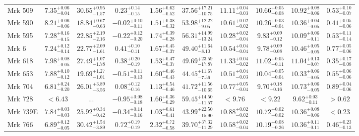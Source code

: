 \documentclass[onecolumn]{mn2e}
\begin{document}
\begin{landscape}
{\begin{center}
\begin{longtable}{lccccccccc}
Mrk 509 & $7.35_{-0.04}^{+0.06}$ & $30.65_{-1.57}^{+0.95}$ & $0.23_{-0.15}^{+0.14}$ & $1.56_{-0.52}^{+0.62}$ &$37.56_{-10.75}^{+17.21}$ & $11.11_{-0.03}^{+0.04}$ & $10.66_{-0.08}^{+0.05}$ & $10.92_{-0.06}^{+0.08}$ & $0.53_{-0.07}^{+0.10}$ \\
Mrk 590 & $8.21_{-0.06}^{+0.06}$ & $18.84_{-0.63}^{+0.67}$ & $-0.02_{-0.11}^{+0.10}$ & $1.51_{-0.32}^{+0.38}$ &$53.98_{-9.05}^{+12.22}$ & $10.61_{-0.02}^{+0.02}$ & $10.26_{-0.04}^{+0.03}$ & $10.36_{-0.05}^{+0.04}$ & $0.41_{-0.06}^{+0.05}$ \\
Mrk 595 & $7.28_{-0.15}^{+0.16}$ & $22.85_{-2.16}^{+2.19}$ & $-0.22_{-0.20}^{+0.12}$ & $1.74_{-0.28}^{+0.39}$ &$56.31_{-13.24}^{+14.99}$ & $10.28_{-0.04}^{+0.02}$ & $9.83_{-0.12}^{+0.09}$ & $10.09_{-0.11}^{+0.06}$ & $0.53_{-0.14}^{+0.11}$ \\
Mrk 6 & $7.24_{-0.14}^{+0.12}$ & $22.77_{-1.61}^{+2.09}$ & $0.41_{-0.11}^{+0.10}$ & $1.67_{-0.37}^{+0.45}$ &$49.40_{-8.10}^{+11.64}$ & $10.54_{-0.04}^{+0.04}$ & $9.78_{-0.08}^{+0.09}$ & $10.46_{-0.05}^{+0.05}$ & $0.77_{-0.06}^{+0.05}$ \\
Mrk 618 & $7.98_{-0.05}^{+0.08}$ & $27.49_{-1.78}^{+1.07}$ & $0.38_{-0.19}^{+0.20}$ & $1.53_{-0.37}^{+0.47}$ &$49.69_{-17.87}^{+23.59}$ & $11.33_{-0.02}^{+0.04}$ & $11.02_{-0.11}^{+0.05}$ & $11.04_{-0.07}^{+0.13}$ & $0.35_{-0.08}^{+0.17}$ \\
Mrk 653 & $7.88_{-0.12}^{+0.10}$ & $19.69_{-1.01}^{+1.27}$ & $-0.51_{-0.13}^{+0.11}$ & $1.60_{-0.43}^{+0.46}$ &$44.45_{-7.56}^{+11.67}$ & $10.51_{-0.03}^{+0.04}$ & $10.04_{-0.04}^{+0.05}$ & $10.33_{-0.05}^{+0.06}$ & $0.55_{-0.06}^{+0.06}$ \\
Mrk 704 & $6.81_{-0.20}^{+0.24}$ & $26.01_{-3.56}^{+3.89}$ & $0.08_{-0.16}^{+0.12}$ & $1.13_{-0.46}^{+0.54}$ &$41.72_{-10.65}^{+11.56}$ & $10.77_{-0.04}^{+0.05}$ & $9.70_{-0.16}^{+0.18}$ & $10.73_{-0.05}^{+0.06}$ & $0.89_{-0.06}^{+0.04}$ \\
Mrk 728 & $<6.43$ & ... & $-0.95_{-0.18}^{+0.08}$ & $1.66_{-0.29}^{+0.36}$ &$59.45_{-11.57}^{+14.50}$ & $<9.76$ & $<9.22$ & $9.62_{-0.11}^{+0.03}$ & $>0.62$ \\
Mrk 739E & $7.84_{-0.03}^{+0.03}$ & $25.92_{-0.42}^{+0.34}$ & $-0.34_{-0.16}^{+0.14}$ & $1.03_{-0.41}^{+0.61}$ &$43.99_{-15.90}^{+22.50}$ & $10.88_{-0.02}^{+0.02}$ & $10.72_{-0.02}^{+0.02}$ & $10.36_{-0.06}^{+0.08}$ & $<0.23$ \\
Mrk 766 & $6.89_{-0.05}^{+0.12}$ & $30.42_{-3.89}^{+1.54}$ & $0.72_{-0.19}^{+0.19}$ & $2.32_{-0.58}^{+0.72}$ &$39.70_{-11.29}^{+37.32}$ & $10.58_{-0.04}^{+0.02}$ & $10.19_{-0.26}^{+0.08}$ & $10.36_{-0.11}^{+0.11}$ & $0.46_{-0.13}^{+0.23}$ \\

\end{longtable}
\end{center}}
\end{landscape}
\end{document}
